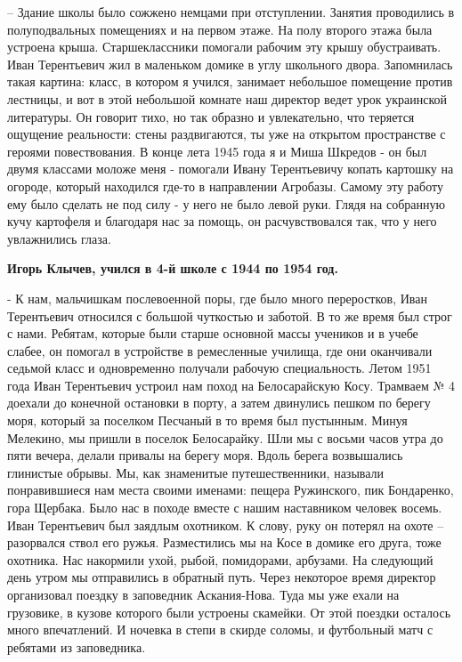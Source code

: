 – Здание школы было сожжено немцами при отступлении. Занятия проводились в
полуподвальных помещениях и на первом этаже. На полу второго этажа была
устроена крыша. Старшеклассники помогали рабочим эту крышу обустраивать. Иван
Терентьевич жил в маленьком домике в углу школьного двора. Запомнилась такая
картина: класс, в котором я учился, занимает небольшое помещение против
лестницы, и вот в этой небольшой комнате наш директор ведет урок украинской
литературы. Он говорит тихо, но так образно и увлекательно, что теряется
ощущение реальности: стены раздвигаются, ты уже на открытом пространстве с
героями повествования. В конце лета 1945 года я и Миша Шкредов - он был двумя
классами моложе меня - помогали Ивану Терентьевичу копать картошку на огороде,
который находился где-то в направлении Агробазы. Самому эту работу ему было
сделать не под силу - у него не было левой руки. Глядя на собранную кучу
картофеля и благодаря нас за помощь, он расчувствовался так, что у него
увлажнились глаза.

\textbf{Игорь Клычев, учился в 4-й школе с 1944 по 1954 год.}

- К нам, мальчишкам послевоенной поры, где было много переростков, Иван
Терентьевич относился с большой чуткостью и заботой. В то же время был строг с
нами. Ребятам, которые были старше основной массы учеников и в учебе слабее, он
помогал в устройстве в ремесленные училища, где они оканчивали седьмой класс и
одновременно получали рабочую специальность. Летом 1951 года Иван Терентьевич
устроил нам поход на Белосарайскую Косу. Трамваем № 4 доехали до конечной
остановки в порту, а затем двинулись пешком по берегу моря, который за поселком
Песчаный в то время был пустынным. Минуя Мелекино, мы пришли в поселок
Белосарайку. Шли мы с восьми часов утра до пяти вечера, делали привалы на
берегу моря. Вдоль берега возвышались глинистые обрывы. Мы, как знаменитые
путешественники, называли понравившиеся нам места своими именами: пещера
Ружинского, пик Бондаренко, гора Щербака. Было нас в походе вместе с нашим
наставником человек восемь. Иван Терентьевич был заядлым охотником. К слову,
руку он потерял на охоте – разорвался ствол его ружья. Разместились мы на Косе
в домике его друга, тоже охотника. Нас накормили ухой, рыбой, помидорами,
арбузами. На следующий день утром мы отправились в обратный путь. Через
некоторое время директор организовал поездку в заповедник Аскания-Нова. Туда мы
уже ехали на грузовике, в кузове которого были устроены скамейки. От этой
поездки осталось много впечатлений. И ночевка в степи в скирде соломы, и
футбольный матч с ребятами из заповедника.

